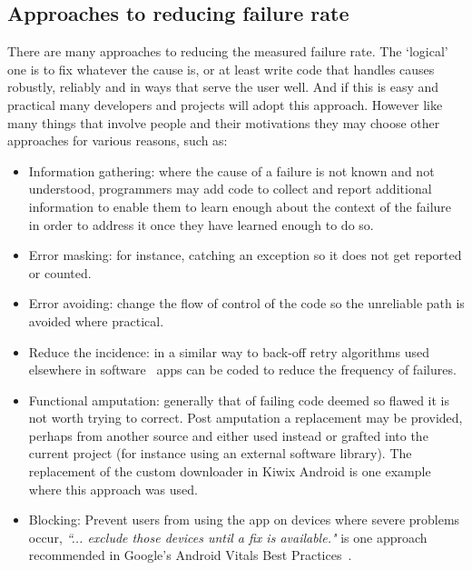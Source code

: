 \subsection{Approaches to reducing failure rate}
There are many approaches to reducing the measured failure rate. The `logical' one is to fix whatever the cause is, or at least write code that handles causes robustly, reliably and in ways that serve the user well. And if this is easy and practical many developers and projects will adopt this approach. However like many things that involve people and their motivations they may choose other approaches for various reasons, such as:

\begin{itemize}
    \item Information gathering: where the cause of a failure is not known and not understood, programmers may add code to collect and report additional information to enable them to learn enough about the context of the failure in order to address it once they have learned enough to do so.
    \item Error masking: for instance, catching an exception so it does not get reported or counted.
    \item Error avoiding: change the flow of control of the code so the unreliable path is avoided where practical.
    \item Reduce the incidence: in a similar way to back-off retry algorithms used elsewhere in software~ apps can be coded to reduce the frequency of failures. 
    \item Functional amputation: generally that of failing code deemed so flawed it is not worth trying to correct. Post amputation a replacement may be provided, perhaps from another source and either used instead or grafted into the current project (for instance using an external software library). The replacement of the custom downloader in Kiwix Android is one example where this approach was used.
    \item Blocking: Prevent users from using the app on devices where severe problems occur, \emph{``... exclude those devices until a fix is available."} is one approach recommended in Google's Android Vitals Best Practices~.
\end{itemize}
\afterpage{\clearpage}

